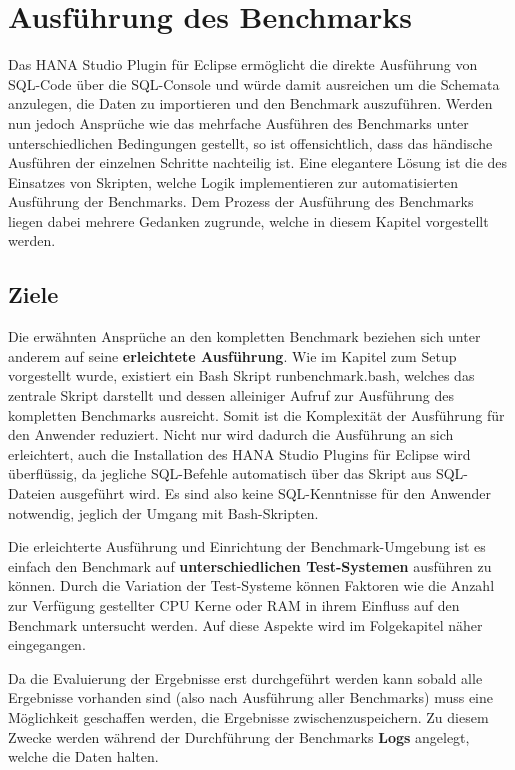 \chapter{Ausführung des Benchmarks}

Das HANA Studio Plugin für Eclipse ermöglicht die direkte Ausführung von SQL-Code über die SQL-Console und würde damit ausreichen um die Schemata anzulegen, die Daten zu importieren und den Benchmark auszuführen. Werden nun jedoch Ansprüche wie das mehrfache Ausführen des Benchmarks unter unterschiedlichen Bedingungen gestellt, so ist offensichtlich, dass das händische Ausführen der einzelnen Schritte nachteilig ist. Eine elegantere Lösung ist die des Einsatzes von Skripten, welche Logik implementieren zur automatisierten Ausführung der Benchmarks. Dem Prozess der Ausführung des Benchmarks liegen dabei mehrere Gedanken zugrunde, welche in diesem Kapitel vorgestellt werden. 

\section{Ziele}

Die erwähnten Ansprüche an den kompletten Benchmark beziehen sich unter anderem auf seine \textbf{erleichtete Ausführung}. Wie im Kapitel zum Setup vorgestellt wurde, existiert ein Bash Skript {\glqq}run{\textunderscore}benchmark.bash{\grqq}, welches das zentrale Skript darstellt und dessen alleiniger Aufruf zur Ausführung des kompletten Benchmarks ausreicht. Somit ist die Komplexität der Ausführung für den Anwender reduziert. Nicht nur wird dadurch die Ausführung an sich erleichtert, auch die Installation des HANA Studio Plugins für Eclipse wird überflüssig, da jegliche SQL-Befehle automatisch über das Skript aus SQL-Dateien ausgeführt wird. Es sind also keine SQL-Kenntnisse für den Anwender notwendig, jeglich der Umgang mit Bash-Skripten. 

Die erleichterte Ausführung und Einrichtung der Benchmark-Umgebung ist es einfach den Benchmark auf \textbf{unterschiedlichen Test-Systemen} ausführen zu können. Durch die Variation der Test-Systeme können Faktoren wie die Anzahl zur Verfügung gestellter CPU Kerne oder RAM in ihrem Einfluss auf den Benchmark untersucht werden. Auf diese Aspekte wird im Folgekapitel näher eingegangen. 

Da die Evaluierung der Ergebnisse erst durchgeführt werden kann sobald alle Ergebnisse vorhanden sind (also nach Ausführung aller Benchmarks) muss eine Möglichkeit geschaffen werden, die Ergebnisse zwischenzuspeichern. Zu diesem Zwecke werden während der Durchführung der Benchmarks \textbf{Logs} angelegt, welche die Daten halten. 

